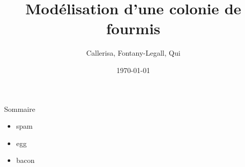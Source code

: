 \documentclass[11pt]{beamer}
\author{Callerisa, Fontany-Legall, Qui}
\title{Modélisation d'une colonie de fourmis}
\institute{Université de Nice}
\date{\today}
\begin{document}
\begin{frame}
\titlepage
\end{frame}


\begin{frame}{Sommaire}

\begin{itemize}[<+->]
\item spam
\item egg
\item bacon

\end{itemize}


\end{frame}
\end{document}
